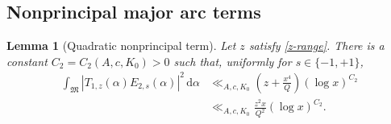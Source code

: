 \documentclass[12pt,reqno]{amsart}
\numberwithin{equation}{section}
\theoremstyle{plain}
\newtheorem{lemma}[theorem]{Lemma}
\theoremstyle{remark}
\newcommand{\dif}{\mathrm{d}}
\newcommand{\majorarc}{\mathfrak{M}}
\begin{document}
\subsection{Nonprincipal major arc terms}

\begin{lemma}[Quadratic nonprincipal term]\label{lem:E2}
Let $z$ satisfy \eqref{z-range}.
There is a constant
$C_2=C_2(A,c,K_0)>0$ such that, uniformly for $s\in\{-1,+1\}$,
\begin{align}
 \int_{\majorarc}
 |T_{1,z}(\alpha)E_{2,s}(\alpha)|^2\,\dif\alpha
 &\ll_{A,c,K_0}
 \left(z+\frac{x^4}{Q}\right)(\log x)^{C_2}
\label{weighted-E2-bound}\\
 &\ll_{A,c,K_0}
 \frac{z^2x}{Q^2}(\log x)^{C_2}.             \label{weighted-E2-target}
\end{align}
\end{lemma}
\end{document}
